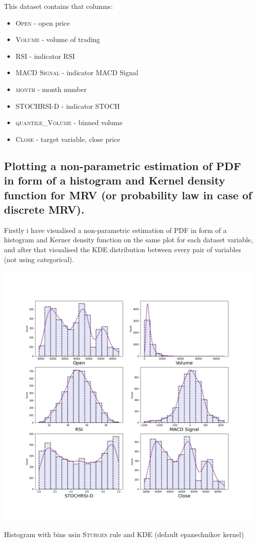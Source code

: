 \documentclass[%
12pt, %
final, %
oneside, %
onecolumn, %
centertags]{article} %
\theoremstyle{plain}
\theoremstyle{definition}
\theoremstyle{remark}
\begin{document}
This dataset contains that columns:

\begin{itemize}
	\item \textsc{Open} - open price
	\item \textsc{Volume} - volume of trading
	\item \textsc{RSI} - indicator RSI
	\item \textsc{MACD Signal} - indicator MACD Signal
	\item \textsc{month} - month number
	\item \textsc{STOCHRSI-D} - indicator STOCH
	\item \textsc{quantile\_Volume} - binned volume
	\item \textsc{Close} - target variable, close price
\end{itemize}

\newpage

\subsection{Plotting a non-parametric estimation of PDF in form of a histogram and Kernel density function for MRV (or probability law in case of discrete MRV).}

Firstly i have visualised a non-parametric estimation of PDF in form of a histogram and Kerner density function on the same plot for each dataset variable, and after that visualised the KDE distribution between every pair of variables (not using categorical). 


\begin{center}
\includegraphics[scale=0.45]{images/task_1_hist.png}

Histogram with bins usin \textsc{Sturges} rule and KDE (default epanechnikov kernel) 
\end{center}
\end{document}
